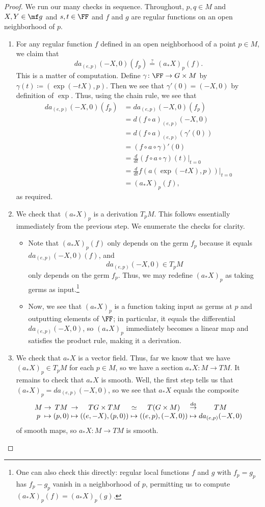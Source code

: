 \documentclass[../notes.tex]{subfiles}
\begin{document}
\begin{proof}
	We run our many checks in sequence. Throughout, $p,q\in M$ and $X,Y\in\mf g$ and $s,t\in\FF$ and $f$ and $g$ are regular functions on an open neighborhood of $p$.
	\begin{enumerate}
		\item For any regular function $f$ defined in an open neighborhood of a point $p\in M$, we claim that
		\[da_{(e,p)}(-X,0)(f_p)\stackrel?=(a_*X)_p(f).\]
		This is a matter of computation. Define $\gamma\colon\FF\to G\times M$ by $\gamma(t)\coloneqq(\exp(-tX),p)$. Then we see that $\gamma'(0)=(-X,0)$ by definition of $\exp$. Thus, using the chain rule, we see that
		\begin{align*}
			da_{(e,p)}(-X,0)(f_p) &= da_{(e,p)}(-X,0)(f_p) \\
			&= d(f\circ a)_{(e,p)}(-X,0) \\
			&= d(f\circ a)_{(e,p)}(\gamma'(0)) \\
			&= (f\circ a\circ\gamma)'(0) \\
			&= \frac d{dt}(f\circ a\circ\gamma)(t)\bigg|_{t=0} \\
			&= \frac d{dt}f(a(\exp(-tX),p))\bigg|_{t=0} \\
			&= (a_*X)_p(f),
		\end{align*}
		as required.

		\item We check that $(a_*X)_p$ is a derivation $T_pM$. This follows essentially immediately from the previous step. We enumerate the checks for clarity.
		\begin{itemize}
			\item Note that $(a_*X)_p(f)$ only depends on the germ $f_p$ because it equals $da_{(e,p)}(-X,0)(f)$, and
			\[da_{(e,p)}(-X,0)\in T_pM\]
			only depends on the germ $f_p$. Thus, we may redefine $(a_*X)_p$ as taking germs as input.\footnote{One can also check this directly: regular local functions $f$ and $g$ with $f_p=g_p$ has $f_p-g_p$ vanish in a neighborhood of $p$, permitting us to compute $(a_*X)_p(f)=(a_*X)_p(g)$.}
			\item Now, we see that $(a_*X)_p$ is a function taking input as germs at $p$ and outputting elements of $\FF$; in particular, it equals the differential $da_{(e,p)}(-X,0)$, so $(a_*X)_p$ immediately becomes a linear map and satisfies the product rule, making it a derivation.
		\end{itemize}

		\item We check that $a_*X$ is a vector field. Thus, far we know that we have $(a_*X)_p\in T_pM$ for each $p\in M$, so we have a section $a_*X\colon M\to TM$. It remains to check that $a_*X$ is smooth. Well, the first step tells us that $(a_*X)_p=da_{(e,p)}(-X,0)$, so we see that $a_*X$ equals the composite
		\[\arraycolsep=1.4pt\begin{array}{cccccccccccc}
			M &\to& TM &\to& TG\times TM &\simeq& T(G\times M) &\stackrel{da}\to& TM \\
			p &\mapsto& (p,0) &\mapsto& ((e,-X),(p,0)) &\mapsto& ((e,p),(-X,0)) &\mapsto& da_{(e,p)}(-X,0)
		\end{array}\]
		of smooth maps, so $a_*X\colon M\to TM$ is smooth.


\end{enumerate}
\end{proof}
\end{document}
